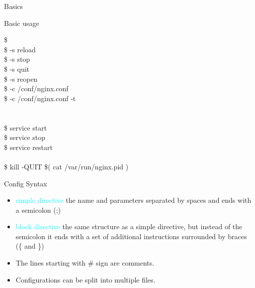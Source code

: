 \documentclass{beamer}
\begin{document}
\begin{frame}{Basics}
\scriptsize
\begin{block}{Basic usage}

	\begin{Alms*}
		\$  \\
		\$  -s reload \\
		\$  -s stop \\
		\$  -s quit \\
		\$  -s reopen \\
		\$  -c /conf/nginx.conf \\
		\$  -c /conf/nginx.conf -t \\
		\\
		\\
		\$ service  start \\
		\$ service  stop \\
		\$ service  restart \\
		\\
		\$ kill -QUIT \$( cat /var/run/nginx.pid )
	\end{Alms*}
\end{block}
	

\end{frame}

\begin{frame}{Config Syntax}

\begin{minipage}[t]{0.95\textwidth}
\begin{itemize}
	\item \textcolor{cyan}{simple directive} the name and parameters separated by spaces and ends with a semicolon (;)
	\item \textcolor{cyan}{block directive} the same structure as a simple directive, but instead of the semicolon it ends with a set of additional instructions surrounded by braces (\{ and \})
	\item The lines starting with \# sign are comments.
	\item Configurations can be split into multiple files.
\end{itemize}
\end{minipage}

\end{frame}
\end{document}
